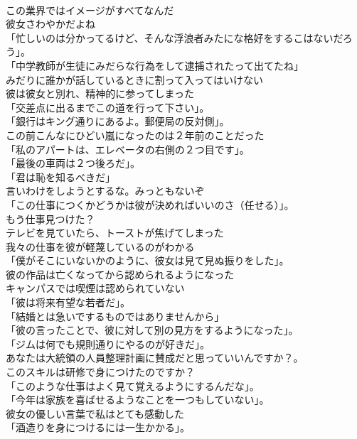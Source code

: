 \documentclass[8pt]{extreport}
\begin{document}
\begin{CJK}{UTF8}{min}
\\	この業界ではイメージがすべてなんだ	
\\	彼女さわやかだよね	
\\	「忙しいのは分かってるけど、そんな浮浪者みたにな格好をするこはないだろう」。	
\\	「中学教師が生徒にみだらな行為をして逮捕されたって出てたね」	
\\	みだりに誰かが話しているときに割って入ってはいけない	
\\	彼は彼女と別れ、精神的に参ってしまった	
\\	「交差点に出るまでこの道を行って下さい」。	
\\	「銀行はキング通りにあるよ。郵便局の反対側」。	
\\	この前こんなにひどい嵐になったのは２年前のことだった	
\\	「私のアパートは、エレベータの右側の２つ目です」。	
\\	「最後の車両は２つ後ろだ」。	
\\	「君は恥を知るべきだ」	
\\	言いわけをしようとするな。みっともないぞ	
\\	「この仕事につくかどうかは彼が決めればいいのさ（任せる）」。	
\\	もう仕事見つけた？	
\\	テレビを見ていたら、トーストが焦げてしまった	
\\	我々の仕事を彼が軽蔑しているのがわかる	
\\	「僕がそこにいないかのように、彼女は見て見ぬ振りをした」。	
\\	彼の作品は亡くなってから認められるようになった	
\\	キャンパスでは喫煙は認められていない	
\\	「彼は将来有望な若者だ」。	
\\	「結婚とは急いでするものではありませんから」	
\\	「彼の言ったことで、彼に対して別の見方をするようになった」。	
\\	「ジムは何でも規則通りにやるのが好きだ」。	
\\	あなたは大統領の人員整理計画に賛成だと思っていいんですか？。	
\\	このスキルは研修で身につけたのですか？	
\\	「このような仕事はよく見て覚えるようにするんだな」。	
\\	「今年は家族を喜ばせるようなことを一つもしていない」。	
\\	彼女の優しい言葉で私はとても感動した	
\\	「酒造りを身につけるには一生かかる」。	

\end{CJK}
\end{document}
